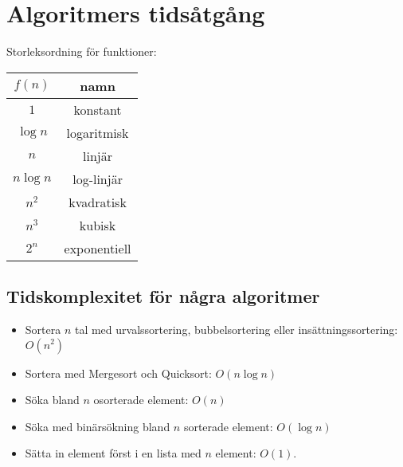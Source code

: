 \documentclass[11pt]{article}
\begin{document}
\section{Algoritmers tidsåtgång}
Storleksordning för funktioner: 
\begin{center}
\begin{tabular}{|c|c|}
\hline
$f(n)$		&	namn \\ \hline \hline
$1$			&	konstant \\
$\log n$	&	logaritmisk \\
$n$			&	linjär \\
$n \log n$	&	log-linjär \\
$n^2$		&	kvadratisk \\
$n^3$		&	kubisk	\\
$2^n$		&	exponentiell \\
\hline
\end{tabular}
\end{center}
\subsection{Tidskomplexitet för några algoritmer}
\begin{itemize}
\item{Sortera $n$ tal med urvalssortering, bubbelsortering eller insättningssortering: $O(n^2)$}
\item{Sortera med Mergesort och Quicksort: $O(n \log n)$}
\item{Söka bland $n$ osorterade element: $O(n)$}
\item{Söka med binärsökning bland $n$ sorterade element: $O(\log n)$}
\item{Sätta in element först i en lista med $n$ element: $O(1)$.}
\end{itemize}
\end{document}
